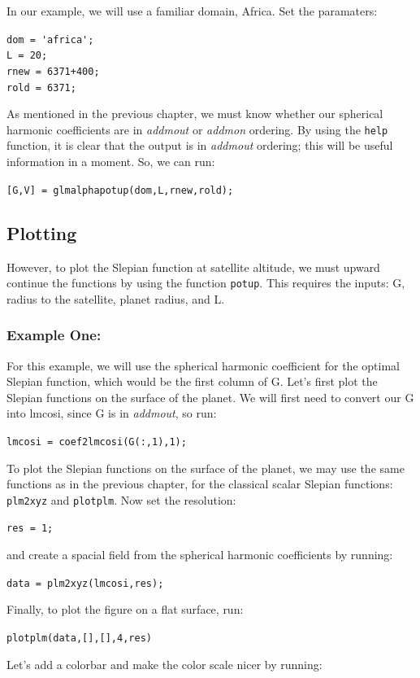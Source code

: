 \documentclass[11pt]{article}
\begin{document}
In our example, we will use a familiar domain, Africa.  Set the paramaters:
 
\verb+dom = 'africa';+  \\
\verb+L = 20;+ \\
\verb|rnew = 6371+400;|  \\
\verb+rold = 6371;+  

As mentioned in the previous chapter, we must know whether our spherical harmonic coefficients are in \textit{addmout} or \textit{addmon} ordering.  By using the \verb+help+ function, it is clear that the output is in \textit{addmout} ordering; this will be useful information in a moment.  So, we can run:

\verb+[G,V] = glmalphapotup(dom,L,rnew,rold);+

\subsection{Plotting}
However, to plot the Slepian function at satellite altitude, we must upward continue the functions by using the function \verb+potup+.  This requires the inputs: G, radius to the satellite, planet radius, and L.  

\subsubsection{Example One:}
For this example, we will use the spherical harmonic coefficient for the optimal Slepian function, which would be the first column of G.  Let's first plot the Slepian functions on the surface of the planet.  We will first need to convert our G into lmcosi, since G is in \textit{addmout}, so run:

\verb+lmcosi = coef2lmcosi(G(:,1),1);+

To plot the Slepian functions on the surface of the planet, we may use the same functions as in the previous chapter, for the classical scalar Slepian functions: \verb+plm2xyz+ and \verb+plotplm+.  Now set the resolution:

\verb+res = 1;+ 

and create a spacial field from the spherical harmonic coefficients by running:

\verb+data = plm2xyz(lmcosi,res);+

Finally, to plot the figure on a flat surface, run:

\verb+plotplm(data,[],[],4,res)+

Let's add a colorbar and make the color scale nicer by running:
\end{document}
